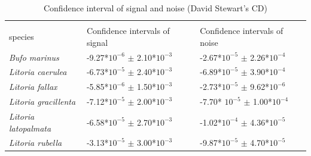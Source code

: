



\begin{table}[htb!]
\centering
\caption[Confidence interval for CD recordings]{Confidence interval of signal and noise (David Stewart's CD)}
\label{tab:CI_CD}
\begin{tabular}{lll}
\hline\hline
    \backslashbox{Frog \\ species}{Parameters}                      & Confidence intervals of signal & Confidence intervals of noise \\ \hline
\textit{Bufo marinus}        &  -9.27*$10^{-6}$ $\pm$ 2.10*$10^{-3}$ &  -2.67*$10^{-5}$ $\pm$ 2.26*$10^{-4}$                             \\ 
\textit{Litoria caerulea}    &      -6.73*$10^{-5}$ $\pm$ 2.40*$10^{-3}$     &                              -6.89*$10^{-5}$ $\pm$ 3.90*$10^{-4}$ \\ 
\textit{Litoria fallax}      &   -5.85*$10^{-6}$ $\pm$ 1.50*$10^{-3}$                             &                              -2.73*$10^{-5}$ $\pm$ 9.62*$10^{-6}$ \\ 
\textit{Litoria gracillenta} &     -7.12*$10^{-5}$ $\pm$ 2.00*$10^{-3}$                           &                              -7.70* $10^{-5}$ $\pm$ 1.00*$10^{-4}$ \\ 
\textit{Litoria latopalmata} &   -6.58*$10^{-5}$ $\pm$ 2.70*$10^{-3}$                            &                              -1.02*$10^{-4}$ $\pm$ 4.36*$10^{-5}$ \\ 
\textit{Litoria rubella}     &   -3.13*$10^{-5}$ $\pm$ 3.00*$10^{-3}$                           &                              -9.87*$10^{-5}$ $\pm$ 4.70*$10^{-5}$ \\ \hline\hline
\end{tabular}
\end{table}




